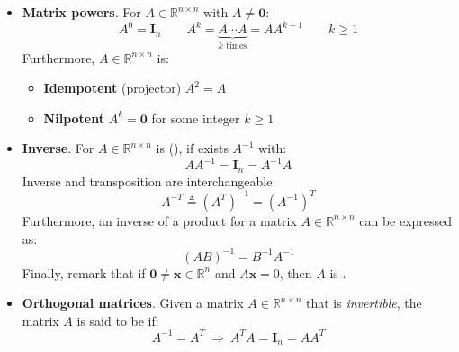 \begin{itemize}
	\item \textbf{Matrix powers}. For $A \in \mathbb{R}^{n \times n}$ with $A \ne \mathbf{0}$:
	\begin{equation*}
		A^{0} = \mathbf{I}_{n} \hspace{2em} A^{k} = \underbrace{A \cdots A}_{k\text{ times}} = AA^{k-1} \hspace{2em} k \ge 1
	\end{equation*}
	Furthermore, $A \in \mathbb{R}^{n \times n}$ is:
	\begin{itemize}
		\item \textbf{Idempotent} (projector) $A^{2} = A$ 
		\item \textbf{Nilpotent} $A^{k} = \mathbf{0}$ for some integer $k \ge 1$ 
	\end{itemize}
	
	\item \textbf{Inverse}. For $A \in \mathbb{R}^{n \times n}$ is  (), if exists $A^{-1}$ with:
	\begin{equation}\label{eq: non-singular matrix}
		AA^{-1} = \mathbf{I}_{n} = A^{-1}A
	\end{equation}
	Inverse and transposition are interchangeable:
	\begin{equation*}
		A^{-T} \triangleq \left(A^{T}\right)^{-1} = \left(A^{-1}\right)^{T}
	\end{equation*}
	Furthermore, an inverse of a product for a matrix $A \in \mathbb{R}^{n \times n}$ can be expressed as:
	\begin{equation*}
		\left(AB\right)^{-1} = B^{-1}A^{-1}
	\end{equation*}
	Finally, remark that if $\mathbf{0} \ne \mathbf{x} \in \mathbb{R}^{n}$ and $A\mathbf{x} = 0$, then $A$ is .
	
	\item \textbf{Orthogonal matrices}. Given a matrix $A \in \mathbb{R}^{n \times n}$ that is \emph{invertible}, the matrix $A$ is said to be  if:
	\begin{equation*}
		A^{-1} = A^{T} \: \Rightarrow \: A^{T}A = \mathbf{I}_{n} = AA^{T}
	\end{equation*}
	

\end{itemize}
